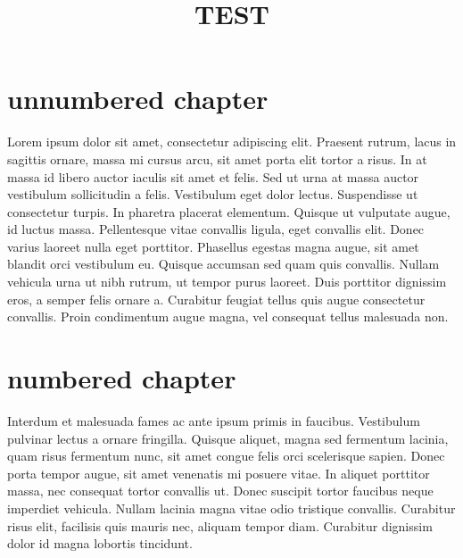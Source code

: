 \documentclass[oneside]{book}
\title {TEST}
\begin{document}
\frontmatter


\maketitle

\clearpage

\tableofcontents

\mainmatter

\chapter*{unnumbered chapter}

Lorem ipsum dolor sit amet, consectetur adipiscing elit. Praesent rutrum, lacus in sagittis ornare, massa mi cursus arcu, sit amet porta elit tortor a risus. In at massa id libero auctor iaculis sit amet et felis. Sed ut urna at massa auctor vestibulum sollicitudin a felis. Vestibulum eget dolor lectus. Suspendisse ut consectetur turpis. In pharetra placerat elementum. Quisque ut vulputate augue, id luctus massa. Pellentesque vitae convallis ligula, eget convallis elit. Donec varius laoreet nulla eget porttitor. Phasellus egestas magna augue, sit amet blandit orci vestibulum eu. Quisque accumsan sed quam quis convallis. Nullam vehicula urna ut nibh rutrum, ut tempor purus laoreet. Duis porttitor dignissim eros, a semper felis ornare a. Curabitur feugiat tellus quis augue consectetur convallis. Proin condimentum augue magna, vel consequat tellus malesuada non.


\chapter{numbered chapter}

Interdum et malesuada fames ac ante ipsum primis in faucibus. Vestibulum pulvinar lectus a ornare fringilla. Quisque aliquet, magna sed fermentum lacinia, quam risus fermentum nunc, sit amet congue felis orci scelerisque sapien. Donec porta tempor augue, sit amet venenatis mi posuere vitae. In aliquet porttitor massa, nec consequat tortor convallis ut. Donec suscipit tortor faucibus neque imperdiet vehicula. Nullam lacinia magna vitae odio tristique convallis. Curabitur risus elit, facilisis quis mauris nec, aliquam tempor diam. Curabitur dignissim dolor id magna lobortis tincidunt. 
\end{document}
